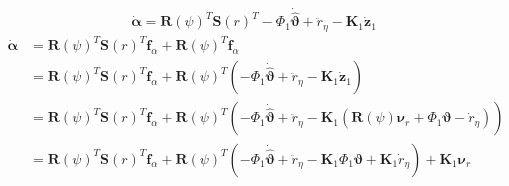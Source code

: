 \documentclass[12pt,a4]{article}
\begin{document}
\begin{equation}
	\bm{\dot{\alpha}} =  \bm{R}(\psi)^T \bm{S}(r)^T - \Phi_1 \bm{\dot{\hat{\vartheta}}} + \ddot{r}_{\eta} - \bm{K}_1 \bm{\dot{z}}_1
\end{equation}
\begin{align}
	\bm{\dot{\alpha}} & =  \bm{R}(\psi)^T \bm{S}(r)^T \bm{f}_\alpha + \bm{R}(\psi)^T \bm{\dot{f}}_\alpha                                             \\
	                  & = \bm{R}(\psi)^T \bm{S}(r)^T \bm{f}_\alpha + \bm{R}(\psi)^T
	\left( - \Phi_1 \bm{\dot{\hat{\vartheta}}} + \ddot{r}_{\eta} - \bm{K}_1 \bm{\dot{z}}_1 \right)                                                   \\
	                  & = \bm{R}(\psi)^T \bm{S}(r)^T \bm{f}_\alpha + \bm{R}(\psi)^T
	\left( - \Phi_1 \bm{\dot{\hat{\vartheta}}} + \ddot{r}_{\eta} - \bm{K}_1 (\bm{R}(\psi)\bm{\nu}_r + \Phi_1\bm{\vartheta} - \dot{r}_{\eta}) \right) \\
	                  & = \bm{R}(\psi)^T \bm{S}(r)^T \bm{f}_\alpha +  \bm{R}(\psi)^T \left(
	- \Phi_1 \bm{\dot{\hat{\vartheta}}} + \ddot{r}_{\eta} - \bm{K}_1 \Phi_1\bm{\vartheta} + \bm{K}_1\dot{r}_{\eta}
	\right)+ \bm{K}_1 \bm{\nu}_r
\end{align}
\end{document}

